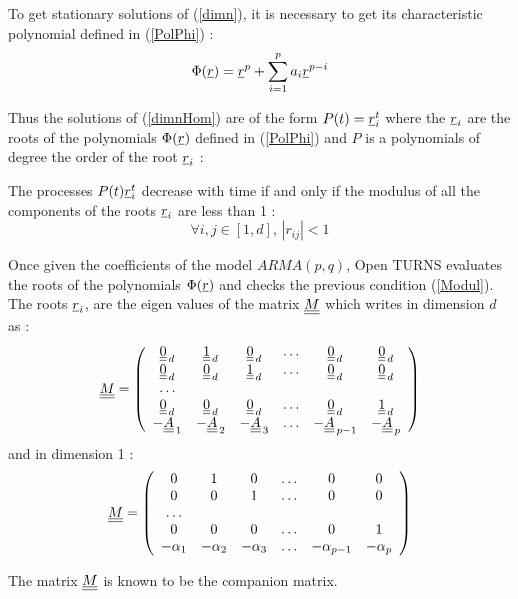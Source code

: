 To get stationary solutions of (\ref{dimn}), it is necessary to get its characteristic polynomial defined in (\ref{PolPhi}) :
\begin{equation}\label{PolPhi}
\Phi({\underline{r}}) = {\underline{r}}^p + \sum_{i=1}^p a_i{\underline{r}}^{p-i} 
\end{equation}


Thus the solutions of (\ref{dimnHom}) are of the form $P(t)={\underline{r}}_i^t$ where the ${\underline{r}}_i$ are the roots of the polynomials $\Phi({\underline{r}})$ defined in (\ref{PolPhi}) and $P$ is a polynomials of degree the order of the root ${\underline{r}}_i$ :


The processes  $P(t){\underline{r}}_i^t$ decrease with time if and only if the modulus of all the components of the roots ${\underline{r}}_i$ are less than 1 : 
\begin{equation}\label{Modul}
  \forall i,j \in [1,d], \,  |r_{ij}| <1
\end{equation}

Once given the coefficients of the model $ARMA(p,q)$, Open TURNS evaluates  the roots of the polynomials $\Phi({\underline{r}})$  and checks the previous  condition (\ref{Modul}). The roots ${\underline{r}}_i$, are the eigen values of the matrix ${\underline{\underline{M}}}$ which writes in dimension $d$ as :
\begin{equation}\label{MatrixMdimn}
{\underline{\underline{M}}} = \left( 
\begin{array}{cccccc}
  {\underline{\underline{0}}}_{\, d} & {\underline{\underline{1}}}_{\, d} & {\underline{\underline{0}}}_{\, d} & \hdots & {\underline{\underline{0}}}_{\, d} & {\underline{\underline{0}}}_{\, d} \\
  {\underline{\underline{0}}}_{\, d} & {\underline{\underline{0}}}_{\, d} & {\underline{\underline{1}}}_{\, d} & \hdots & {\underline{\underline{0}}}_{\, d} & {\underline{\underline{0}}}_{\, d}\\
  \hdots \\
  {\underline{\underline{0}}}_{\, d} & {\underline{\underline{0}}}_{\, d} & {\underline{\underline{0}}}_{\, d} & \hdots & {\underline{\underline{0}}}_{\, d} & {\underline{\underline{1}}}_{\, d}\\
 - {\underline{\underline{A}}}_{\, 1} & -{\underline{\underline{A}}}_{\, 2} & - {\underline{\underline{A}}}_{\, 3}& \hdots  & -{\underline{\underline{A}}}_{\, p-1}& -{\underline{\underline{A}}}_{\, p}
\end{array}
\right )
\end{equation}
and  in dimension 1 : 
\begin{equation}\label{MatrixMdim1}
{\underline{\underline{M}}} = \left( 
\begin{array}{cccccc}
  0 & 1 & 0 & \hdots & 0 & 0\\
  0 & 0 & 1 & \hdots & 0 & 0\\
  \hdots \\
  0 & 0 & 0 & \hdots & 0 & 1\\
 -\alpha_1 & -\alpha_2 & -\alpha_3 & \hdots  & -\alpha_{p-1} & -\alpha_p
\end{array}
\right )
\end{equation}

The matrix ${\underline{\underline{M}}}$ is known to be the companion matrix. 
